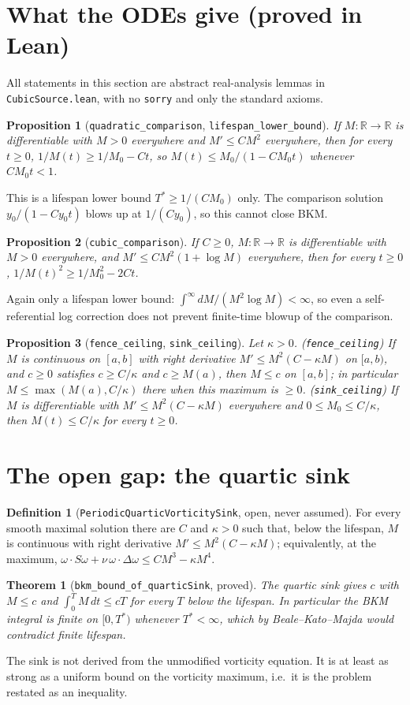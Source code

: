 \documentclass[11pt]{article}
\newtheorem{theorem}{Theorem}
\newtheorem{proposition}{Proposition}
\theoremstyle{definition}
\newtheorem{definition}{Definition}
\theoremstyle{remark}
\begin{document}
\section{What the ODEs give (proved in Lean)}
All statements in this section are abstract real-analysis lemmas in \texttt{CubicSource.lean}, with no \texttt{sorry} and only the standard axioms.
\begin{proposition}[\texttt{quadratic\_comparison}, \texttt{lifespan\_lower\_bound}]
If $M:\mathbb R\to\mathbb R$ is differentiable with $M>0$ everywhere and $M'\le CM^2$ everywhere, then for every $t\ge0$, $1/M(t)\ge 1/M_0-Ct$, so $M(t)\le M_0/(1-CM_0t)$ whenever $CM_0t<1$.
\end{proposition}
This is a lifespan lower bound $T^*\ge 1/(CM_0)$ only. The comparison solution $y_0/(1-Cy_0t)$ blows up at $1/(Cy_0)$, so this cannot close BKM.
\begin{proposition}[\texttt{cubic\_comparison}]
If $C\ge0$, $M:\mathbb R\to\mathbb R$ is differentiable with $M>0$ everywhere, and $M'\le CM^2(1+\log M)$ everywhere, then for every $t\ge0$, $1/M(t)^2\ge 1/M_0^2-2Ct$.
\end{proposition}
Again only a lifespan lower bound: $\int^\infty dM/(M^2\log M)<\infty$, so even a self-referential log correction does not prevent finite-time blowup of the comparison.
\begin{proposition}[\texttt{fence\_ceiling}, \texttt{sink\_ceiling}]
Let $\kappa>0$. (\texttt{fence\_ceiling}) If $M$ is continuous on $[a,b]$ with right derivative $M'\le M^2(C-\kappa M)$ on $[a,b)$, and $c\ge0$ satisfies $c\ge C/\kappa$ and $c\ge M(a)$, then $M\le c$ on $[a,b]$; in particular $M\le\max(M(a),C/\kappa)$ there when this maximum is $\ge0$. (\texttt{sink\_ceiling}) If $M$ is differentiable with $M'\le M^2(C-\kappa M)$ everywhere and $0\le M_0\le C/\kappa$, then $M(t)\le C/\kappa$ for every $t\ge0$.
\end{proposition}

\section{The open gap: the quartic sink}
\begin{definition}[\texttt{PeriodicQuarticVorticitySink}, open, never assumed]
For every smooth maximal solution there are $C$ and $\kappa>0$ such that, below the lifespan, $M$ is continuous with right derivative $M'\le M^2(C-\kappa M)$; equivalently, at the maximum, $\omega\cdot S\omega+\nu\,\omega\cdot\Delta\omega\le CM^3-\kappa M^4$.
\end{definition}
\begin{theorem}[\texttt{bkm\_bound\_of\_quarticSink}, proved]
The quartic sink gives $c$ with $M\le c$ and $\int_0^T M\,dt\le cT$ for every $T$ below the lifespan. In particular the BKM integral is finite on $[0,T^*)$ whenever $T^*<\infty$, which by Beale--Kato--Majda would contradict finite lifespan.
\end{theorem}
The sink is not derived from the unmodified vorticity equation. It is at least as strong as a uniform bound on the vorticity maximum, i.e.\ it is the problem restated as an inequality.
\end{document}
